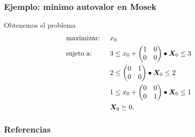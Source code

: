 \documentclass[aspectratio=169,12pt,spanish]{beamer}
\begin{document}

\begin{frame}
\frametitle{Ejemplo: mínimo autovalor en Mosek}

Obtenemos el problema
{\small
\begin{alignat*}{2}
  & \text{maximizar: } & & x_0 \\
  & \text{sujeto a: }  \quad & &  3 \le x_0 + \begin{pmatrix} 1 & 0 \\ 0 & 0 \end{pmatrix} \bullet \bm{X}_0 \le 3 \\
  &&& 2 \le \begin{pmatrix} 0 & 1 \\ 0 & 0 \end{pmatrix} \bullet \bm{X}_0 \le 2 \\
  &&& 1 \le x_0 + \begin{pmatrix} 0 & 0 \\ 0 & 1 \end{pmatrix} \bullet \bm{X}_0 \le 1 \\
  &&& \bm{X}_0 \succeq 0.  
\end{alignat*}
}
\end{frame}


\begin{frame}

\frametitle{Referencias}




\end{frame}

\end{document}
